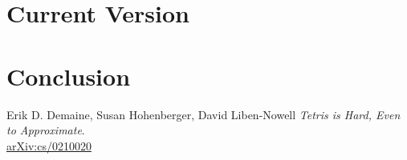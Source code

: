 \documentclass[ fontsize=11pt]{article}
\begin{document}
\section{Current Version}
\label{sec:current_version}

\section{Conclusion}
\label{sec:conclusion}

\newpage


\begin{thebibliography}{9}
Erik D. Demaine, Susan Hohenberger, David Liben-Nowell
\textit{
Tetris is Hard, Even to Approximate}.
\\\href{https://arxiv.org/abs/cs/0210020}{arXiv:cs/0210020}

\end{thebibliography}
\end{document}
